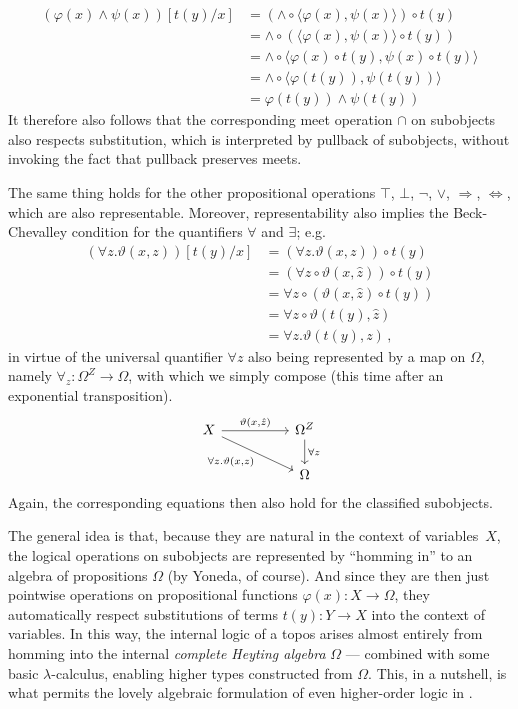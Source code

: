 \documentclass[12pt,reqno]{amsart}
\renewcommand{\to}{\ensuremath{\rightarrow}}
\theoremstyle{remark}
\theoremstyle{definition}
\begin{document}
\begin{align*}
(\varphi(x)\wedge\psi(x))[t(y)/x] &= (\wedge \circ \langle \varphi(x), \psi(x) \rangle) \circ t(y)\\
&= \wedge \circ (\langle \varphi(x), \psi(x) \rangle \circ t(y))\\
&= \wedge \circ \langle \varphi(x)\circ t(y), \psi(x)\circ t(y) \rangle\\
&=  \wedge \circ  \langle \varphi(t(y)), \psi(t(y))\rangle \\
&=  \varphi(t(y))\wedge\psi(t(y)) 
\end{align*}
It therefore also follows that the corresponding meet operation $\cap$ on subobjects also respects substitution, which is interpreted by pullback of subobjects, without invoking the fact that pullback preserves meets.

The same thing holds for the other propositional operations $\top$, $\bot$, $\neg$, $\vee$, $\Rightarrow$, $\Leftrightarrow$, which are also representable.  Moreover, representability also implies the Beck-Chevalley condition for the quantifiers $\forall$ and $\exists$; e.g.\
\begin{align*}
(\forall z .\vartheta(x,z))[t(y)/x] &= (\forall z .\vartheta(x,z))\circ t(y) \\
&= (\forall z \circ \vartheta(x,\hat{z}))\circ t(y)\\
&= \forall z \circ (\vartheta(x,\hat{z})\circ t(y))\\
&= \forall z \circ \vartheta(t(y),\hat{z})\\
&= \forall z .\vartheta(t(y),z)\,,
\end{align*}
in virtue of the universal quantifier $\forall z$ also being represented by a map on $\Omega$, namely $\forall_z : \Omega^{Z} \to \Omega$, with which we simply compose (this time after an exponential transposition).
\begin{equation}\label{diag:BCforQ}
\begin{tikzcd}
 X \ar[rr, "{\vartheta(x,\hat{z})}" ] \ar[rrd,swap,  "{\forall z. \vartheta(x,z)}"] && \Omega^{Z} \ar[d, "{\forall z}"] \\
 && \Omega
\end{tikzcd}
\end{equation}
Again, the corresponding equations then also hold for the classified subobjects.

The general idea is that, because they are natural in the context of variables~$X$, the logical operations on subobjects are represented by ``homming in'' to an algebra of propositions $\Omega$ (by Yoneda, of course). And since they are then just pointwise operations on propositional functions $\varphi(x) : X \to \Omega$, they automatically respect substitutions of terms $t(y): Y \to X$  into the context of variables.  In this way,  the internal logic of a topos arises almost entirely from homming into the internal \emph{complete Heyting algebra} $\Omega$ --- combined with some basic $\lambda$-calculus, enabling higher types constructed from $\Omega$.  This, in a nutshell, is what permits the lovely algebraic formulation of even higher-order logic in \cite{LS:1988}.  
\end{document}
